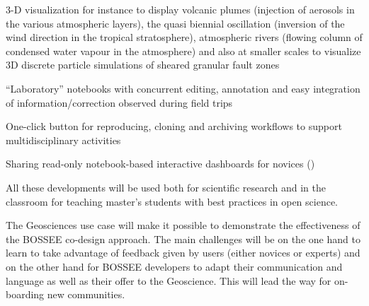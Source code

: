\begin{task}[
  title=Geosciences application,
  id=geoscience,
  lead=UIO,
  PM=24,
  wphases={0-48},
  partners={QS,SRL}
]
\begin{compactitem}
  \item 3-D visualization for instance to display volcanic plumes
    (injection of aerosols in the various atmospheric layers), the
    quasi biennial oscillation (inversion of the wind direction in the
    tropical stratosphere), atmospheric rivers (flowing column of
    condensed water vapour in the atmosphere) and also at smaller
    scales to visualize 3D discrete particle simulations of sheared
    granular fault zones 
  \item “Laboratory” notebooks with concurrent editing, annotation and
    easy integration of information/correction observed during field
    trips 
  \item One-click button for reproducing, cloning and archiving
    workflows to support multidisciplinary activities 
   \item Sharing read-only notebook-based interactive dashboards for
     novices 
    ()
  \end{compactitem}

  All these developments will be used both for scientific research and
  in the classroom for teaching master's students with best practices
  in open science.

  The Geosciences use case will make it possible to demonstrate the
  effectiveness of the BOSSEE co-design approach. The main challenges
  will be on the one hand to learn to take advantage of feedback given
  by users (either novices or experts) and on the other hand for
  BOSSEE developers to adapt their communication and language as well
  as their offer to the Geoscience. This will lead the way for
  on-boarding new communities.

\end{task}
